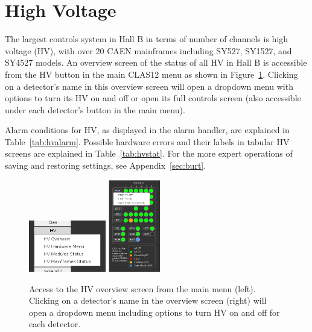 \documentclass[amsmath,amssymb,notitlepage,11pt]{revtex4}
\begin{document}
\clearpage

\section{High Voltage}
The largest controls system in Hall B in terms of number of channels is high voltage (HV), with over 20 CAEN mainframes including SY527, SY1527, and SY4527 models.  An overview screen of the status of all HV in Hall B is accessible from the HV button in the main CLAS12 menu as shown in Figure~\ref{fig:hv}.  Clicking on a detector's name in this overview screen will open a dropdown menu with options to turn its HV on and off or open its full controls screen (also accessible under each detector's button in the main menu).

Alarm conditions for HV, as displayed in the alarm handler, are explained in Table~\ref{tab:hvalarm}.  Possible hardware errors and their labels in tabular HV screens are explained in Table~\ref{tab:hvstat}.  For the more expert operations of saving and restoring settings, see Appendix~\ref{sec:burt}.

\begin{figure}[htbp]\centering
  \includegraphics[width=0.3\textwidth]{pics/hvmenu}
  \includegraphics[width=0.2\textwidth]{pics/hvstat}
  \caption{Access to the HV overview screen from the main menu (left).  Clicking on a detector's name in the overview screen (right) will open a dropdown menu including options to turn HV on and off for each detector.\label{fig:hv}}
\end{figure}
\end{document}
